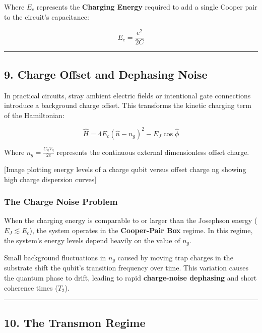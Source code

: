 \documentclass[
]{article}
\begin{document}
Where \(E_c\) represents the \textbf{Charging Energy} required to add a
single Cooper pair to the circuit's capacitance:

\[E_c = \frac{e^2}{2C}\]

\begin{center}\rule{0.5\linewidth}{0.5pt}\end{center}

\subsection{9. Charge Offset and Dephasing
Noise}\label{charge-offset-and-dephasing-noise}

In practical circuits, stray ambient electric fields or intentional gate
connections introduce a background charge offset. This transforms the
kinetic charging term of the Hamiltonian:

\[\hat{H} = 4 E_c (\hat{n} - n_g)^2 - E_J \cos \hat{\phi}\]

Where \(n_g = \frac{C_g V_g}{2e}\) represents the continuous external
dimensionless offset charge.

{[}Image plotting energy levels of a charge qubit versus offset charge
ng showing high charge dispersion curves{]}

\subsubsection{The Charge Noise Problem}\label{the-charge-noise-problem}

When the charging energy is comparable to or larger than the Josephson
energy (\(E_J \lesssim E_c\)), the system operates in the
\textbf{Cooper-Pair Box} regime. In this regime, the system's energy
levels depend heavily on the value of \(n_g\).

Small background fluctuations in \(n_g\) caused by moving trap charges
in the substrate shift the qubit's transition frequency over time. This
variation causes the quantum phase to drift, leading to rapid
\textbf{charge-noise dephasing} and short coherence times (\(T_2\)).

\begin{center}\rule{0.5\linewidth}{0.5pt}\end{center}

\subsection{10. The Transmon Regime}\label{the-transmon-regime}
\end{document}

